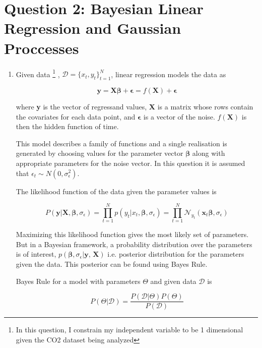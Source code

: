 \documentclass{article}
\begin{document}
\section{Question 2: Bayesian Linear Regression and Gaussian Proccesses}

\begin{enumerate}
	\item Given data
	\footnote{In this question, I constrain my independent variable to be 1 dimensional given the CO2 dataset being analyzed}
	, $\mathcal{D} = \{ x_t, y_t \}_{t=1}^N$, linear regression models the data as
	
	\begin{equation}
		\textbf{y} = \textbf{X}\boldsymbol{\beta} + \boldsymbol{\epsilon} = f(\textbf{X}) + \boldsymbol{\epsilon}
	\end{equation}
	
	where \textbf{y} is the vector of regressand values, \textbf{X} is a matrix whose rows contain the covariates for each data point, and $\boldsymbol{\epsilon}$ is a vector of the noise. $f(\textbf{X})$ is then the hidden function of time.
	
	This model describes a family of functions and a single realisation is generated by choosing values for the parameter vector $\boldsymbol{\beta}$ along with appropriate parameters for the noise vector. In this question it is assumed that $\epsilon_t \sim N(0,\sigma_\epsilon^2)$.
	
	The likelihood function of the data given the parameter values is
	
	\begin{equation}
		P(\textbf{y} | \textbf{X},\boldsymbol{\beta}, \sigma_\epsilon) = \prod_{t=1}^N p(y_t | x_t, \boldsymbol{\beta}, \sigma_\epsilon) = \prod_{t=1}^N \mathcal{N}_{y_t} (\textbf{x}_t \boldsymbol{\beta}, \sigma_\epsilon)
	\end{equation}
	
	Maximizing this likelihood function gives the most likely set of parameters. But in a Bayesian framework, a probability distribution over the parameters is of interest, $p(\boldsymbol{\beta},\sigma_\epsilon| \textbf{y, X})$ i.e. posterior distribution for the parameters given the data. This posterior can be found using Bayes Rule.
	
	Bayes Rule for a model with parameters $\Theta$ and given data $\mathcal{D}$ is
	
	\begin{equation}
		P(\Theta | \mathcal{D}) = \frac{ P(\mathcal{D} | \Theta) P(\Theta) }{P(\mathcal{D})}
	\end{equation}
	

\end{enumerate}
\end{document}
